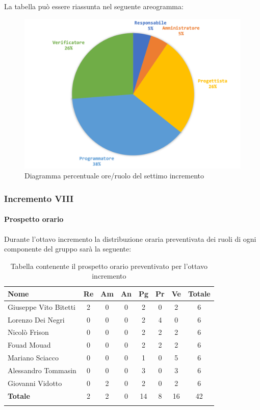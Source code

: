 			La tabella può essere riassunta nel seguente areogramma:
			\begin{figure}[H]
				\centering
				\includegraphics[width=0.8\linewidth]{./images/preventivo/incremento7-2.png}
				\caption{Diagramma percentuale ore/ruolo del settimo incremento}
				\label{fig:diagramma costi ruolo incremento VII}
			\end{figure}
			\pagebreak
			
			
		\subsubsection{Incremento VIII}
			\paragraph{Prospetto orario}
			Durante l'ottavo incremento la distribuzione oraria preventivata dei ruoli di ogni componente del gruppo sarà la seguente:
			
			\begin{longtable}{|l|c|c|c|c|c|c|c|}
				\hline
				\rowcolor{lighter-grayer}
				\textbf{Nome} & \textbf{Re} & \textbf{Am} & \textbf{An} & \textbf{Pg}  & \textbf{Pr}   & \textbf{Ve} & \textbf{Totale} \\
				\hline
				\endfirsthead
				
				\hline
				Giuseppe Vito Bitetti 		 & 2 & 0 & 0 & 2 & 0 & 2 & 6\\
				\hline
				\hline
				Lorenzo Dei Negri			 & 0 & 0 & 0 & 2 & 4 & 0 & 6\\
				\hline
				\hline
				Nicolò Frison				      & 0 & 0 & 0 & 2 & 2 & 2 & 6\\
				\hline
				\hline
				Fouad Mouad 				   & 0 & 0 & 0 & 2 & 2 & 2 & 6\\
				\hline
				\hline
				Mariano Sciacco 			 & 0 & 0 & 0 & 1 & 0 & 5 & 6\\
				\hline
				\hline
				Alessandro Tommasin    & 0 & 0 & 0 & 3 & 0 & 3 & 6\\
				\hline
				\hline
				Giovanni Vidotto 			  & 0 & 2 & 0 & 2 & 0 & 2 & 6\\
				\hline 
				\textbf{Totale}			 		 & 2 & 2 & 0 & 14 & 8 & 16 & 42\\
				\hline
				\caption{Tabella contenente il prospetto orario preventivato per l'ottavo incremento}
			\end{longtable}
			
